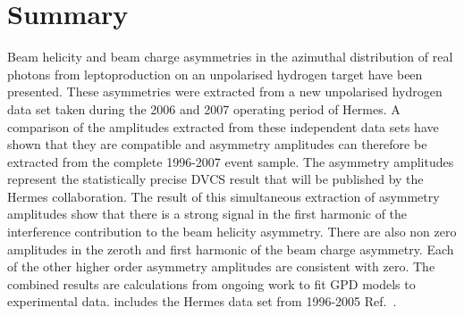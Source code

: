 \section{Summary}

Beam helicity and beam charge asymmetries in the azimuthal distribution of real photons from leptoproduction on an unpolarised hydrogen target have been presented. These asymmetries were extracted from a new unpolarised hydrogen data set taken during the 2006 and 2007 operating period of H{\sc ermes}. A comparison of the amplitudes extracted from these independent data sets have shown that they are compatible and asymmetry amplitudes can therefore be extracted from the complete 1996-2007 event sample. The   asymmetry amplitudes represent the statistically  precise DVCS result that will be published by the H{\sc ermes} collaboration. The result of this simultaneous extraction of asymmetry amplitudes show that there is a strong signal in the first harmonic of the interference contribution to the beam helicity asymmetry. There are also non zero amplitudes in the zeroth and first harmonic of the beam charge asymmetry. Each of the other higher order asymmetry amplitudes are consistent with zero. The combined results are  calculations from ongoing work to fit GPD models to experimental data.  includes the H{\sc ermes} data set from 1996-2005 Ref.~\cite{Air09}. 


